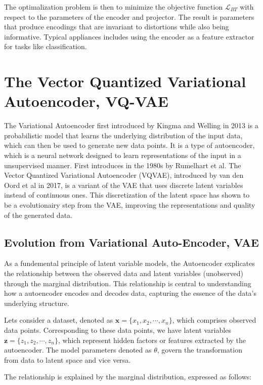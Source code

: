 The optimalization problem is then to minimize the objective function $\mathcal{L}_{BT}$ with respect to the parameters of the encoder and projector. The result is parameters that produce encodings that are invariant to distortions while also being informative.
Typical appliances includes using the encoder as a feature extractor for tasks like classification.

\section{The Vector Quantized Variational Autoencoder, VQ-VAE}
The Variational Autoencoder first introduced by Kingma and Welling in 2013\cite{VAE} is a probabilistic model that learns the underlying distribution of the input data, which can then be used to generate new data points. It is a type of autoencoder, which is a neural network designed to learn
representations of the input in a unsupervised manner. First introduces in the 1980s by Rumelhart et al\cite{Rumelhart}. The Vector Quantized Variational Autoencoder (VQVAE), introduced by van den Oord et al\cite{neuvqvae} in 2017, is a variant of the VAE that uses discrete latent variables instead of continuous ones.
This discretization of the latent space has shown to be a evolutionairy step from the VAE, improving the representations and quality of the generated data.

\subsection{Evolution from Variational Auto-Encoder, VAE}
As a fundemental principle of latent variable models, the Autoencoder explicates the relationship between the observed data and latent variables (unobserved) through the marginal distribution. This relationship is central to understanding how a autoencoder encodes and decodes data, capturing the essence of the data's underlying structure.

Lets consider a dataset, denoted as $\mathbf{x}=\{x_1, x_2, \cdots, x_n \}$, which comprises observed data points. Corresponding to these data points, we have latent variables $\mathbf{z}=\{z_1, z_2, \cdots, z_n \}$, which represent hidden factors or features extracted by the autoencoder.
The model parameters denoted as $\theta$, govern the transformation from data to latent space and vice versa.

The relationship is explained by the marginal distribution, expressed as follows:


